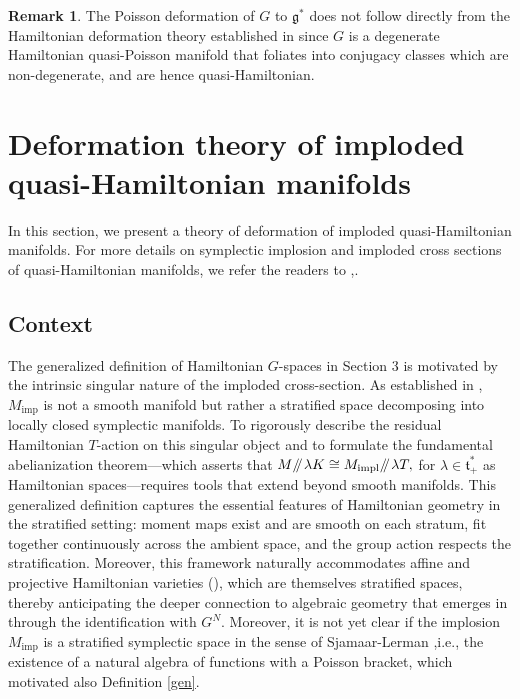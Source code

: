 \documentclass[reqno]{amsart}
\theoremstyle{plain}
\theoremstyle{definition}
\newtheorem{Rem}[Thm]{Remark}
\newcommand{\g}{\mathfrak{g}}
\renewcommand{\t}{\mathfrak{t}}
\newcommand{\imp}{\text{imp}}
\newcommand{\sll}[1]{\mkern-4mu\mathbin{/\mkern-5mu/}_{\mkern-4mu{#1}}}
\begin{document}
\begin{Rem}
The Poisson deformation of $G$ to $\g^*$ does not follow directly from the Hamiltonian deformation theory established in \cite{JMM2025deformations} since $G$ is a degenerate Hamiltonian quasi-Poisson manifold that foliates into conjugacy classes which are non-degenerate, and are hence quasi-Hamiltonian.
\end{Rem}
\section{Deformation theory of imploded quasi-Hamiltonian manifolds} \label{sec 5}

In this section, we present a theory of deformation of imploded quasi-Hamiltonian manifolds. For more details on symplectic implosion and imploded cross sections of quasi-Hamiltonian manifolds, we refer the readers to \cite{guillemin2002},\cite{hurtubise2006group}.

\subsection{Context}

The generalized definition of Hamiltonian $G$-spaces in Section 3 is motivated by the intrinsic singular nature of the imploded cross-section. As established in \cite[]{hurtubise2006group}, $M_{\imp}$ is not a smooth manifold but rather a stratified space decomposing into locally closed symplectic manifolds. To rigorously describe the residual Hamiltonian $T$-action on this singular object and to formulate the fundamental abelianization theorem---which asserts that $M\sll{}\lambda K \cong M_{\text{impl}}\sll{}\lambda T,$ for $\lambda \in \t^{*}_+$ as Hamiltonian spaces---requires tools that extend beyond smooth manifolds. This generalized definition captures the essential features of Hamiltonian geometry in the stratified setting: moment maps exist and are smooth on each stratum, fit together continuously across the ambient space, and the group action respects the stratification. Moreover, this framework naturally accommodates affine and projective Hamiltonian varieties (\cite[]{hurtubise2006group}), which are themselves stratified spaces, thereby anticipating the deeper connection to algebraic geometry that emerges in \cite[]{hurtubise2006group} through the identification with $G^N$. Moreover, it is not yet clear if the implosion $M_\imp$ is a stratified symplectic space in the sense of Sjamaar-Lerman \cite{sjamaar1991stratified},i.e., the existence of a natural algebra of functions with a Poisson bracket, which motivated also Definition \ref{gen}. 
\end{document}

